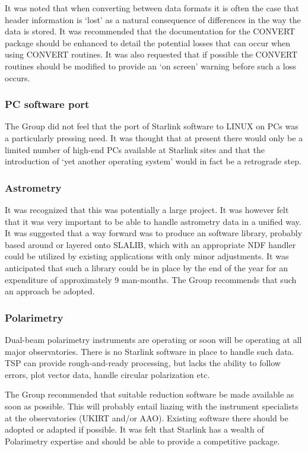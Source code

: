 It was noted that when converting between data formats it is often the
case that header information is `lost' as a natural consequence of
differences in the way the data is stored. It was recommended that the
documentation for the CONVERT package should be enhanced to detail the
potential losses that can occur when using CONVERT routines. It was
also requested that if possible the CONVERT routines should be
modified to provide an `on screen' warning before such a loss occurs.

\subsubsection{\label{ipSSG:PC}PC software port}

The Group did not feel that the port of Starlink software to LINUX on
PCs was a particularly pressing need. It was thought that at present
there would only be a limited number of high-end PCs available at
Starlink sites and that the introduction of `yet another operating
system' would in fact be a retrograde step.

\subsubsection{Astrometry}

It was recognized that this was potentially a large project. It was
however felt that it was very important to be able to handle
astrometry data in a unified way.  It was suggested that a way forward
was to produce an software library, probably based around or layered
onto SLALIB, which with an appropriate NDF handler could be utilized
by existing applications with only minor adjustments. It was
anticipated that such a library could be in place by the end of the
year for an expenditure of approximately 9 man-months.  The Group
recommends that such an approach be adopted.

\subsubsection{Polarimetry}

Dual-beam polarimetry instruments are operating or soon will be
operating at all major observatories. There is no Starlink software in
place to handle such data. TSP can provide rough-and-ready processing,
but lacks the ability to follow errors, plot vector data, handle
circular polarization etc.

The Group recommended that suitable reduction software be made
available as soon as possible. This will probably entail liazing with
the instrument specialists at the observatories (UKIRT and/or
AAO). Existing software there should be adopted or adapted if
possible. It was felt that Starlink has a wealth of Polarimetry
expertise and should be able to provide a competitive package.

